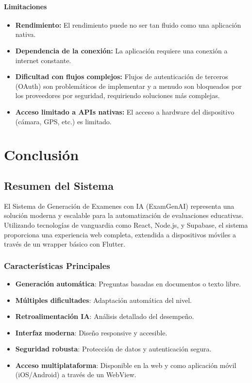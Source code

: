 \documentclass[12pt,a4paper]{report}
\begin{document}
\subsubsection{Limitaciones}
\begin{itemize}
    \item \textbf{Rendimiento:} El rendimiento puede no ser tan fluido como una aplicación nativa.
    \item \textbf{Dependencia de la conexión:} La aplicación requiere una conexión a internet constante.
    \item \textbf{Dificultad con flujos complejos:} Flujos de autenticación de terceros (OAuth) son problemáticos de implementar y a menudo son bloqueados por los proveedores por seguridad, requiriendo soluciones más complejas.
    \item \textbf{Acceso limitado a APIs nativas:} El acceso a hardware del dispositivo (cámara, GPS, etc.) es limitado.
\end{itemize}

\chapter{Conclusión}

\section{Resumen del Sistema}

El Sistema de Generación de Examenes con IA (ExamGenAI) representa una solución moderna y escalable para la automatización de evaluaciones educativas. Utilizando tecnologías de vanguardia como React, Node.js, y Supabase, el sistema proporciona una experiencia web completa, extendida a dispositivos móviles a través de un wrapper básico con Flutter.

\subsection{Características Principales}
\begin{itemize}
    \item \textbf{Generación automática}: Preguntas basadas en documentos o texto libre.
    \item \textbf{Múltiples dificultades}: Adaptación automática del nivel.
    \item \textbf{Retroalimentación IA}: Análisis detallado del desempeño.
    \item \textbf{Interfaz moderna}: Diseño responsive y accesible.
    \item \textbf{Seguridad robusta}: Protección de datos y autenticación segura.
    \item \textbf{Acceso multiplataforma}: Disponible en la web y como aplicación móvil (iOS/Android) a través de un WebView.
\end{itemize}
\end{document}
